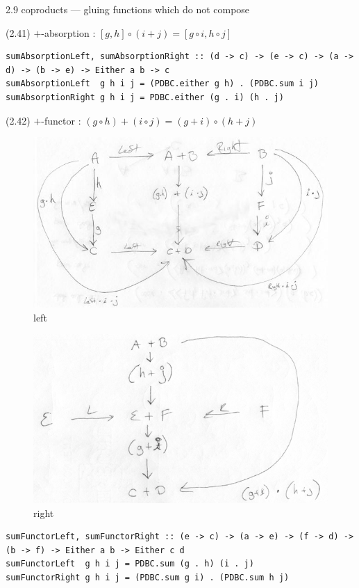 \documentclass[presentation]{beamer}
\begin{document}
\begin{frame}[fragile,label=sec-8]{2.9 coproducts --- gluing functions which do not compose}
\begin{block}{(2.41) $+$-absorption : $[ g , h ] \circ ( i + j ) = [ g \circ i, h \circ j ]$}
\begin{verbatim}
sumAbsorptionLeft, sumAbsorptionRight :: (d -> c) -> (e -> c) -> (a -> d) -> (b -> e) -> Either a b -> c
sumAbsorptionLeft  g h i j = (PDBC.either g h) . (PDBC.sum i j)
sumAbsorptionRight g h i j = PDBC.either (g . i) (h . j)
\end{verbatim}
\end{block}

\begin{block}{(2.42) $+$-functor : $(g \circ h) + (i \circ j) = (g + i) \circ (h + j)$}
\begin{figure}[htb]
\centering
\includegraphics[width=.9\linewidth]{./sum-functor-1m.jpg}
\caption{left}
\end{figure}

\begin{figure}[htb]
\centering
\includegraphics[width=.9\linewidth]{./sum-functor-2m.png}
\caption{right}
\end{figure}

\begin{verbatim}
sumFunctorLeft, sumFunctorRight :: (e -> c) -> (a -> e) -> (f -> d) -> (b -> f) -> Either a b -> Either c d
sumFunctorLeft  g h i j = PDBC.sum (g . h) (i . j)
sumFunctorRight g h i j = (PDBC.sum g i) . (PDBC.sum h j)
\end{verbatim}
\end{block}


\end{frame}
\end{document}
